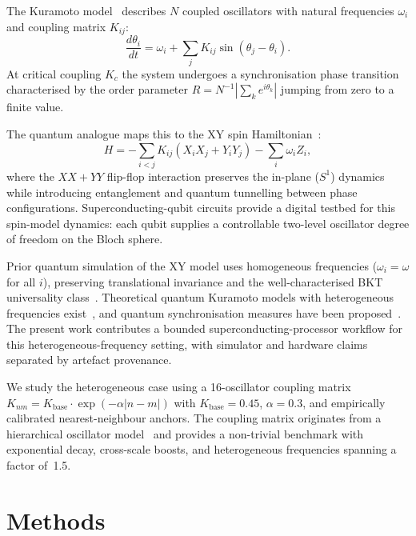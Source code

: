 \documentclass[twocolumn,prl,superscriptaddress,showpacs,floatfix]{revtex4-2}
\begin{document}
The Kuramoto model~\cite{Kuramoto1984} describes $N$ coupled oscillators
with natural frequencies $\omega_i$ and coupling matrix $K_{ij}$:
%
\begin{equation}\label{eq:kuramoto}
  \frac{d\theta_i}{dt} = \omega_i
    + \sum_j K_{ij}\sin(\theta_j - \theta_i).
\end{equation}
%
At critical coupling $K_c$ the system undergoes a synchronisation phase
transition characterised by the order parameter
$R = N^{-1}|\sum_k e^{i\theta_k}|$ jumping from zero to a finite value.

The quantum analogue maps this to the XY spin
Hamiltonian~\cite{Pikovsky2001}:
%
\begin{equation}\label{eq:xy}
  H = -\sum_{i<j} K_{ij}(X_i X_j + Y_i Y_j) - \sum_i \omega_i Z_i,
\end{equation}
%
where the $XX + YY$ flip-flop interaction preserves the in-plane ($S^1$)
dynamics while introducing entanglement and quantum tunnelling between
phase configurations. Superconducting-qubit circuits provide a digital
testbed for this spin-model dynamics: each qubit supplies a controllable
two-level oscillator degree of freedom on the Bloch sphere.

Prior quantum simulation of the XY model uses homogeneous frequencies
($\omega_i = \omega$ for all $i$), preserving translational invariance
and the well-characterised BKT universality
class~\cite{Berezinskii1972,Kosterlitz1973}. Theoretical quantum
Kuramoto models with heterogeneous frequencies
exist~\cite{Pikovsky2001,Acebron2005}, and quantum synchronisation
measures have been proposed~\cite{Ameri2015,Galve2013,Ma2020,Giorgi2013}.
The present work contributes a bounded superconducting-processor workflow
for this heterogeneous-frequency setting, with simulator and hardware
claims separated by artefact provenance.

We study the heterogeneous case using a 16-oscillator coupling matrix
$K_{nm} = K_{\mathrm{base}} \cdot \exp(-\alpha|n-m|)$ with
$K_{\mathrm{base}} = 0.45$, $\alpha = 0.3$, and empirically calibrated
nearest-neighbour anchors. The coupling matrix originates from a
hierarchical oscillator model~\cite{Sotek2025} and provides a
non-trivial benchmark with exponential decay, cross-scale boosts, and
heterogeneous frequencies spanning a factor of~1.5.

\section{Methods}
\end{document}
